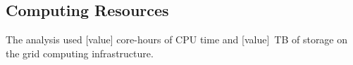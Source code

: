 \subsection{Computing Resources}
\label{sec:APPENDIX_SOFTWARE_COMPUTING}

The analysis used [value] core-hours of CPU time and [value]~TB of storage on the grid computing infrastructure.
